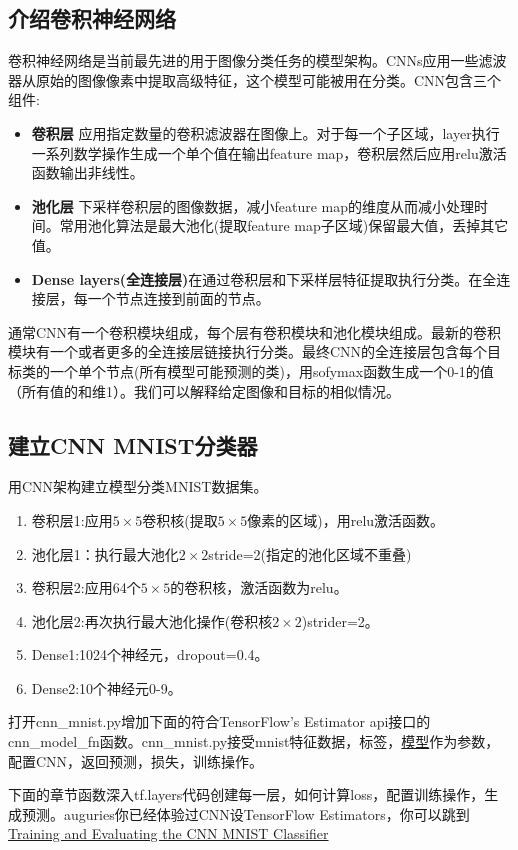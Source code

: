 \subsection{介绍卷积神经网络}
卷积神经网络是当前最先进的用于图像分类任务的模型架构。CNNs应用一些滤波器从原始的图像像素中提取高级特征，这个模型可能被用在分类。CNN包含三个组件:
\begin{itemize}
  \item \textbf{卷积层} 应用指定数量的卷积滤波器在图像上。对于每一个子区域，layer执行一系列数学操作生成一个单个值在输出feature map，卷积层然后应用relu激活函数输出非线性。
  \item \textbf{池化层} 下采样卷积层的图像数据，减小feature map的维度从而减小处理时间。常用池化算法是最大池化(提取feature map子区域)保留最大值，丢掉其它值。
  \item \textbf{Dense layers(全连接层)}在通过卷积层和下采样层特征提取执行分类。在全连接层，每一个节点连接到前面的节点。
\end{itemize}
通常CNN有一个卷积模块组成，每个层有卷积模块和池化模块组成。最新的卷积模块有一个或者更多的全连接层链接执行分类。最终CNN的全连接层包含每个目标类的一个单个节点(所有模型可能预测的类)，用sofymax函数生成一个0-1的值（所有值的和维1）。我们可以解释给定图像和目标的相似情况。
\subsection{建立CNN MNIST分类器}
用CNN架构建立模型分类MNIST数据集。
\begin{enumerate}
  \item 卷积层1:应用$5\times5$卷积核(提取$5\times5$像素的区域)，用relu激活函数。
  \item 池化层1：执行最大池化$2\times2$stride=2(指定的池化区域不重叠)
  \item 卷积层2:应用64个$5\times5$的卷积核，激活函数为relu。
  \item 池化层2:再次执行最大池化操作(卷积核$2\times2$)strider=2。
  \item Dense1:1024个神经元，dropout=0.4。
  \item Dense2:10个神经元0-9。
\end{enumerate}
打开cnn\_mnist.py增加下面的符合TensorFlow's Estimator api接口的cnn\_model\_fn函数。cnn\_mnist.py接受mnist特征数据，标签，\href{https://www.tensorflow.org/api_docs/python/tf/estimator/ModeKeys}{模型}作为参数，配置CNN，返回预测，损失，训练操作。
\begin{python}

\end{python}
下面的章节函数深入tf.layers代码创建每一层，如何计算loss，配置训练操作，生成预测。auguries你已经体验过CNN设TensorFlow Estimators，你可以跳到\href{https://www.tensorflow.org/tutorials/layers#training-and-evaluating-the-cnn-mnist-classifier}{Training and Evaluating the CNN MNIST Classifier}
